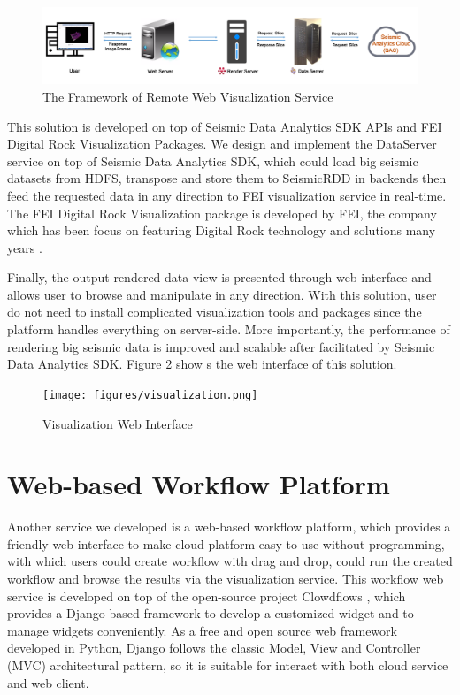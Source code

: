 \begin{figure}[h]
\centering
\includegraphics[scale=0.3]{figures/visualization_framework.png}
\caption{The Framework of Remote Web Visualization Service}
\label{visualization_framework}
\end{figure}

This solution is developed on top of Seismic Data Analytics SDK APIs and FEI Digital Rock Visualization Packages. We design and implement the DataServer service on top of Seismic Data Analytics SDK, which could load big seismic datasets from HDFS, transpose and store them to SeismicRDD in backends then feed the requested data in any direction to FEI visualization service in real-time. The FEI Digital Rock Visualization package is developed by FEI, the company which has been focus on featuring Digital Rock technology and solutions many years \cite{FEICompany}. 

Finally, the output rendered data view is presented through web interface and allows user to browse and manipulate in any direction. With this solution, user do not need to install complicated visualization tools and packages since the platform handles everything on server-side. More importantly, the performance of rendering big seismic data is improved and scalable after facilitated by Seismic Data Analytics SDK. Figure \ref{visualization} show s the web interface of this solution.

\begin{figure}[h]
\centering
\texttt{[image: figures/visualization.png]}
\caption{Visualization Web Interface}
\label{visualization}
\end{figure}


\section{Web-based Workflow Platform}

Another service we developed is a web-based workflow platform, which provides a friendly web interface to make cloud platform easy to use without programming, with which users could create workflow with drag and drop, could run the created workflow and browse the results via the visualization service. This workflow web service is developed on top of the open-source project Clowdflows \cite{Clowdflows}, which provides a Django based framework to develop a customized widget and to manage widgets conveniently. As a free and open source web  framework developed in Python, Django follows the classic Model, View and Controller (MVC) architectural pattern, so it is suitable for interact with both cloud service and web client.

